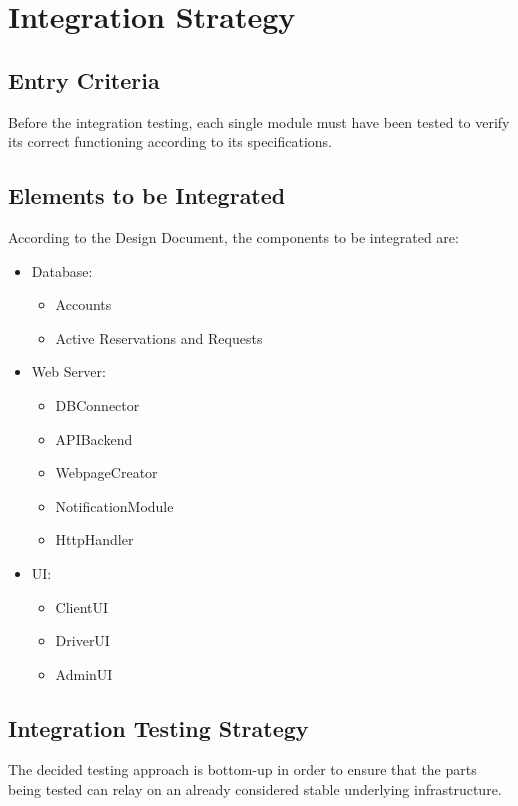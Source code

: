 \documentclass{article}
\begin{document}
\section{Integration Strategy}
\subsection{Entry Criteria}
Before the integration testing, each single module must have been tested to verify its correct functioning according to its specifications.
\subsection{Elements to be Integrated}
According to the Design Document, the components to be integrated are:
\begin{itemize}
	\item Database: 
	\begin{itemize}
		\item Accounts
		\item Active Reservations and Requests
	\end{itemize}
	\item Web Server: 
	\begin{itemize}
		\item DBConnector
		\item APIBackend
		\item WebpageCreator
		\item NotificationModule
		\item HttpHandler
	\end{itemize}
	\item UI:\@
	\begin{itemize}
		\item ClientUI
		\item DriverUI
		\item AdminUI
	\end{itemize}
\end{itemize}
\subsection{Integration Testing Strategy}
The decided testing approach is bottom-up in order to ensure that the parts being tested can relay on an already considered stable underlying infrastructure.
\end{document}
